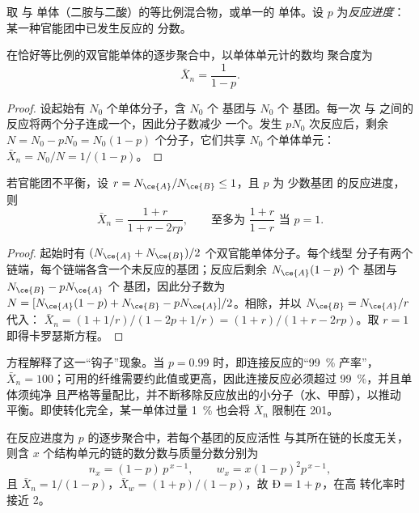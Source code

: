 取  与  单体（二胺与二酸）的等比例混合物，或单一的
 单体。设 $p$ 为\emph{反应进度}：某一种官能团中已发生反应的
分数。

\begin{theorem}[卡罗瑟斯方程]\label{thm:b2:polymer-synthesis:carothers}
在恰好等比例的双官能单体的逐步聚合中，以单体单元计的数均
聚合度为
\begin{equation*}
\bar X_n = \frac{1}{1 - p}.
\end{equation*}
\end{theorem}

\begin{proof}
设起始有 $N_0$ 个单体分子，含 $N_0$ 个  基团与 $N_0$ 个  基团。每一次
 与  之间的反应将两个分子连成一个，因此分子数减少
一个。发生 $pN_0$ 次反应后，剩余 $N = N_0 - pN_0 = N_0(1-p)$ 个分子，它们共享
$N_0$ 个单体单元：$\bar X_n = N_0/N = 1/(1-p)$。
\end{proof}

\begin{corollary}[不平衡]\label{cor:b2:polymer-synthesis:imbalance}
若官能团不平衡，设 $r = N_{\ce{A}}/N_{\ce{B}} \le 1$，且 $p$ 为
少数基团  的反应进度，则
\begin{equation*}
\bar X_n = \frac{1 + r}{1 + r - 2rp}, \qquad \text{至多为 } \frac{1+r}{1-r} \text{ 当 } p = 1.
\end{equation*}
\end{corollary}

\begin{proof}
起始时有 $(N_{\ce{A}} + N_{\ce{B}})/2$ 个双官能单体分子。每个线型
分子有两个链端，每个链端各含一个未反应的基团；反应后剩余 $N_{\ce{A}}(1-p)$
个  基团与 $N_{\ce{B}} - pN_{\ce{A}}$ 个  基团，因此分子数为 $N = [N_{\ce{A}}(1-p) + N_{\ce{B}} -
pN_{\ce{A}}]/2$。相除，并以 $N_{\ce{B}} = N_{\ce{A}}/r$ 代入：
$\bar X_n = (1 + 1/r)/(1 - 2p + 1/r) = (1+r)/(1 + r - 2rp)$。取 $r = 1$ 即得卡罗瑟斯方程。
\end{proof}

方程解释了这一“钩子”现象。当 $p = 0.99$ 时，即连接反应的“99~\% 产率”，$\bar X_n =
100$；可用的纤维需要约此值或更高，因此连接反应必须超过 99~\%，并且单体须纯净
且严格等量配比，并不断移除反应放出的小分子（水、甲醇），以推动
平衡。即使转化完全，某一单体过量 1~\% 也会将 $\bar X_n$ 限制在 201。

\begin{theorem}[弗洛里分布]\label{thm:b2:polymer-synthesis:flory}
在反应进度为 $p$ 的逐步聚合中，若每个基团的反应活性
与其所在链的长度无关，则含 $x$ 个结构单元的链的数分数与质量分数分别为
\begin{equation*}
n_x = (1-p)\,p^{\,x-1}, \qquad w_x = x(1-p)^2 p^{\,x-1},
\end{equation*}
且 $\bar X_n = 1/(1-p)$，$\bar X_w = (1+p)/(1-p)$，故 $\text{\DH} = 1 + p$，在高
转化率时接近 2。
\end{theorem}

